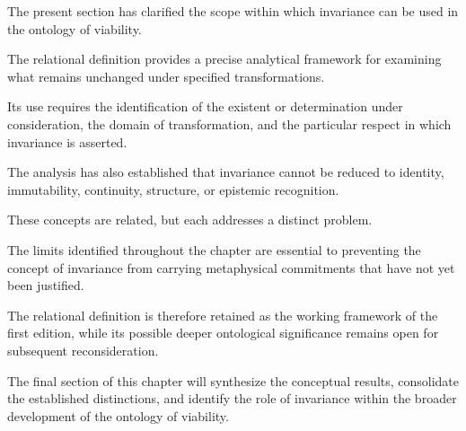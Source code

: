 The present section has clarified
the scope within which invariance
can be used in the ontology of
viability.

The relational definition provides
a precise analytical framework
for examining what remains
unchanged under specified
transformations.

Its use requires the identification
of the existent or determination
under consideration, the domain
of transformation, and the
particular respect in which
invariance is asserted.

The analysis has also established
that invariance cannot be reduced
to identity, immutability,
continuity, structure, or
epistemic recognition.

These concepts are related,
but each addresses a distinct
problem.

The limits identified throughout
the chapter are essential to
preventing the concept of
invariance from carrying
metaphysical commitments
that have not yet been justified.

The relational definition is
therefore retained as the
working framework of the
first edition, while its
possible deeper ontological
significance remains open
for subsequent reconsideration.

The final section of this chapter
will synthesize the conceptual
results, consolidate the
established distinctions,
and identify the role of
invariance within the broader
development of the ontology
of viability.

